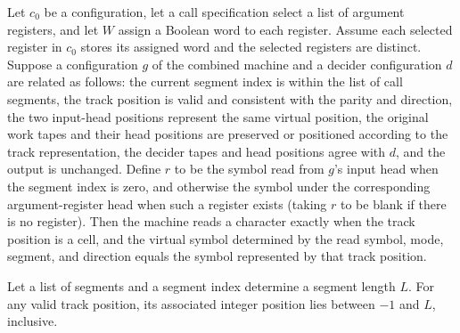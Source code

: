 \begin{lemma}
\label{Complexity.LogProg.track_read}
\leanok
{}
Let $c_0$ be a configuration, let a call specification select a list of argument
registers, and let $W$ assign a Boolean word to each register. Assume each selected
register in $c_0$ stores its assigned word and the selected registers are distinct.
Suppose a configuration $g$ of the combined machine and a decider configuration $d$ are
related as follows: the current segment index is within the list of call segments, the
track position is valid and consistent with the parity and direction, the two input-head
positions represent the same virtual position, the original work tapes and their head
positions are preserved or positioned according to the track representation, the decider
tapes and head positions agree with $d$, and the output is unchanged. Define $r$ to be
the symbol read from $g$'s input head when the segment index is zero, and otherwise the
symbol under the corresponding argument-register head when such a register exists
(taking $r$ to be blank if there is no register). Then the machine reads a character
exactly when the track position is a cell, and the virtual symbol determined by the read
symbol, mode, segment, and direction equals the symbol represented by that track
position.
\end{lemma}

\begin{lemma}
\label{Complexity.LogProg.trackPos_bounds}
\leanok
{}
Let a list of segments and a segment index determine a segment length $L$. For any valid
track position, its associated integer position lies between $-1$ and $L$, inclusive.
\end{lemma}

